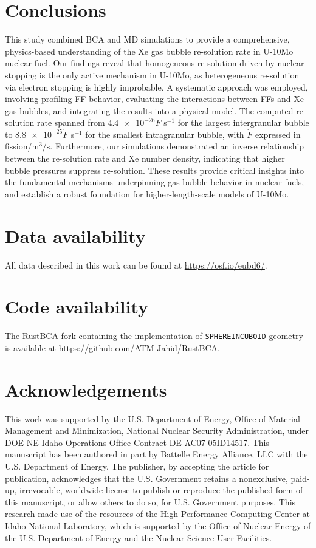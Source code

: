 \documentclass[review]{elsarticle}
\begin{document}
\section{Conclusions}

This study combined BCA and MD simulations to provide
a comprehensive, physics-based understanding
of the Xe gas bubble re-solution rate in U-10Mo nuclear fuel.
Our findings reveal that homogeneous re-solution driven by nuclear stopping
is the only active mechanism in U-10Mo,
as heterogeneous re-solution via electron stopping is highly improbable.
A systematic approach was employed,
involving profiling FF behavior,
evaluating the interactions between FFs and Xe gas bubbles,
and integrating the results into a physical model.
The computed re-solution rate spanned
from $\num{4.4e-26} \dot{F}$ s$^{-1}$ for the largest intergranular bubble
to $\num{8.8e-25} \dot{F}$ s$^{-1}$ for the smallest intragranular bubble,
with $\dot{F}$ expressed in fission/m$^3$/s.
Furthermore, our simulations demonstrated an inverse relationship
between the re-solution rate and Xe number density,
indicating that higher bubble pressures suppress re-solution.
These results provide critical insights into
the fundamental mechanisms underpinning gas bubble behavior in nuclear fuels,
and establish a robust foundation for higher-length-scale models of U-10Mo.


\section{Data availability}

All data described in this work can be found
at \url{https://osf.io/eubd6/}.


\section{Code availability}

The RustBCA fork containing
the implementation of \texttt{SPHEREINCUBOID} geometry
is available at \url{https://github.com/ATM-Jahid/RustBCA}.


\section{Acknowledgements}

This work was supported by the U.S. Department of Energy,
Ofﬁce of Material Management and Minimization,
National Nuclear Security Administration,
under DOE-NE Idaho Operations Ofﬁce Contract DE-AC07-05ID14517.
This manuscript has been authored in part
by Battelle Energy Alliance, LLC with the U.S. Department of Energy.
The publisher, by accepting the article for publication,
acknowledges that the U.S. Government retains
a nonexclusive, paid-up, irrevocable, worldwide license
to publish or reproduce the published form of this manuscript,
or allow others to do so, for U.S. Government purposes.
This research made use of the resources of
the High Performance Computing Center at Idaho National Laboratory,
which is supported by the Ofﬁce of Nuclear Energy
of the U.S. Department of Energy and the Nuclear Science User Facilities.
\end{document}
